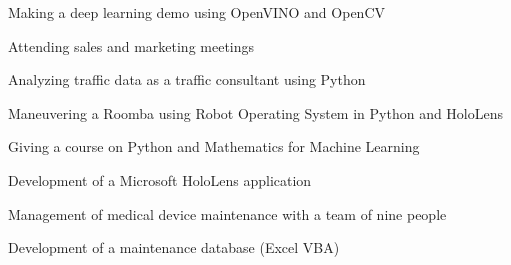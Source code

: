 \begin{tightemize}
\item Making a deep learning demo using OpenVINO and OpenCV
\item Attending sales and marketing meetings 
\end{tightemize}
\sectionsep

\newpage

\begin{tightemize}
\item Analyzing traffic data as a traffic consultant using Python
\end{tightemize}
\sectionsep

\begin{tightemize}
\item Maneuvering a Roomba using Robot Operating System in Python and HoloLens
\end{tightemize}
\sectionsep

\begin{tightemize}
\item Giving a course on Python and Mathematics for Machine Learning
\end{tightemize}
\sectionsep

\begin{tightemize}
\item Development of a Microsoft HoloLens application
\end{tightemize}
\sectionsep

\begin{tightemize}
\item Management of medical device maintenance with a team of nine people
\item Development of a maintenance database (Excel VBA)
\end{tightemize}
\sectionsep

\vspace{3mm}